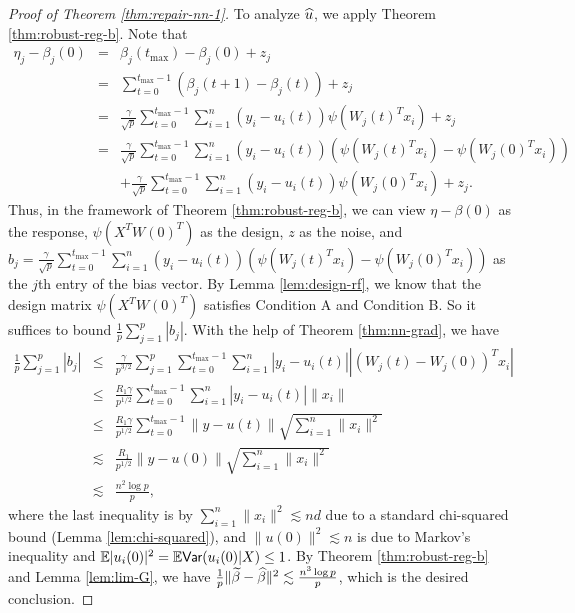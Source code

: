 \begin{proof}[Proof of Theorem \ref{thm:repair-nn-1}]
To analyze $\widehat{u}$, we apply Theorem \ref{thm:robust-reg-b}. Note that
\begin{eqnarray*}
\eta_j - \beta_j(0) &=& \beta_j(t_{\max}) - \beta_j(0) +z_j \\
&=& \sum_{t=0}^{t_{\max}-1}\left(\beta_j(t+1)-\beta_j(t)\right) + z_j \\
&=& \frac{\gamma}{\sqrt{p}}\sum_{t=0}^{t_{\max}-1}\sum_{i=1}^n(y_i-u_i(t))\psi(W_j(t)^Tx_i) + z_j \\
&=& \frac{\gamma}{\sqrt{p}}\sum_{t=0}^{t_{\max}-1}\sum_{i=1}^n(y_i-u_i(t))(\psi(W_j(t)^Tx_i)-\psi(W_j(0)^Tx_i)) \\
&& + \frac{\gamma}{\sqrt{p}}\sum_{t=0}^{t_{\max}-1}\sum_{i=1}^n(y_i-u_i(t))\psi(W_j(0)^Tx_i) + z_j.
\end{eqnarray*}
Thus, in the framework of Theorem \ref{thm:robust-reg-b}, we can view $\eta-\beta(0)$ as the response, $\psi(X^TW(0)^T)$ as the design, $z$ as the noise, and $b_j=\frac{\gamma}{\sqrt{p}}\sum_{t=0}^{t_{\max}-1}\sum_{i=1}^n(y_i-u_i(t))(\psi(W_j(t)^Tx_i)-\psi(W_j(0)^Tx_i))$ as the $j$th entry of the bias vector. By Lemma \ref{lem:design-rf}, we know that the design matrix $\psi(X^TW(0)^T)$ satisfies Condition A and Condition B. So it suffices to bound $\frac{1}{p}\sum_{j=1}^p|b_j|$. With the help of Theorem \ref{thm:nn-grad}, we have
\begin{eqnarray*}
\frac{1}{p}\sum_{j=1}^p|b_j| &\leq& \frac{\gamma}{p^{3/2}}\sum_{j=1}^p\sum_{t=0}^{t_{\max}-1}\sum_{i=1}^n|y_i-u_i(t)||(W_j(t)-W_j(0))^Tx_i| \\
&\leq& \frac{R_1\gamma}{p^{1/2}}\sum_{t=0}^{t_{\max}-1}\sum_{i=1}^n|y_i-u_i(t)|\|x_i\| \\
&\leq& \frac{R_1\gamma}{p^{1/2}}\sum_{t=0}^{t_{\max}-1}\|y-u(t)\|\sqrt{\sum_{i=1}^n\|x_i\|^2} \\
&\lesssim& \frac{R_1}{p^{1/2}}\|y-u(0)\|\sqrt{\sum_{i=1}^n\|x_i\|^2} \\
&\lesssim& \frac{n^2\log p}{p},
\end{eqnarray*}
where the last inequality is by $\sum_{i=1}^n\|x_i\|^2\lesssim nd$ due to a standard chi-squared bound (Lemma \ref{lem:chi-squared}), and $\|u(0)\|^2\lesssim n$ is due to Markov's inequality and $\mathbb{E}|u_i(0)|^2 = \mathbb{E}\textsf{Var}(u_i(0)|X) \leq 1$. By Theorem \ref{thm:robust-reg-b} and Lemma \ref{lem:lim-G}, we have $\frac{1}{p}\|\widetilde{\beta}-\widehat{\beta}\|^2 \lesssim \frac{n^3\log p}{p}$, which is the desired conclusion.
\end{proof}

